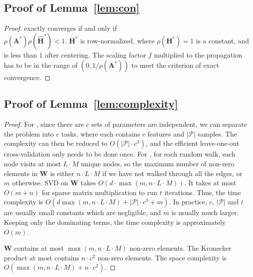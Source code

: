 \subsection{Proof of Lemma~\ref{lem:con}}
\label{ap:subsec:proofcon}
\begin{proof}
\method exactly converges if and only if \\$\rho{({\boldsymbol A}^{*})}\rho{(\hat{\boldsymbol H}^{*})} < 1$. 
${\boldsymbol H}^{*}$ is row-normalized, where $\rho{({\boldsymbol H}^{*})} = 1$ is a constant, and is less than $1$ after centering.
The scaling factor $f$ multiplied to the propagation has to be in the range of $(0, 1/\rho{({\boldsymbol A}^{*})})$ to meet the criterion of exact convergence.
\end{proof}

\vspace{-3mm}
\subsection{Proof of Lemma~\ref{lem:complexity}}

\label{ap:subsec:proofcomplexity}
\begin{proof}
For \methodest, since there are $c$ sets of parameters are independent, we can separate the problem into $c$ tasks, where each contains $c$ features and $|\mathcal{P}|$ samples. 
The complexity can then be reduced to $O(|\mathcal{P}| \cdot c^{3})$, and the efficient leave-one-out cross-validation only needs to be done once.
For \methodexp, for each random walk, each node visits at most $L \cdot M$ unique nodes, so the maximum number of non-zero elements in ${\boldsymbol W}$ is either $n \cdot L \cdot M$ if we have not walked through all the edges, or $m$ otherwise. 
SVD on ${\boldsymbol W}$ takes $O(d \cdot \max{(m, n \cdot L \cdot M)})$. 
It takes at most $O(m + n)$ for sparse matrix multiplication to run $t$ iterations.
Thus, the time complexity is $O(d \max{(m, n \cdot L \cdot M)} + |\mathcal{P}| \cdot c^{3} + m)$.
In practice, $c$, $|\mathcal{P}|$ and $t$ are usually small constants which are negligible, and $m$ is usually much larger. 
Keeping only the dominating terms, the time complexity is approximately $O(m)$.

${\boldsymbol W}$ contains at most $\max{(m, n \cdot L \cdot M)}$ non-zero elements. The Kronecker product at most contains $n \cdot c^{2}$ non-zero elements. 
The space complexity is $O(\max{(m, n \cdot L \cdot M)} + n \cdot c^{2})$.
\end{proof}

